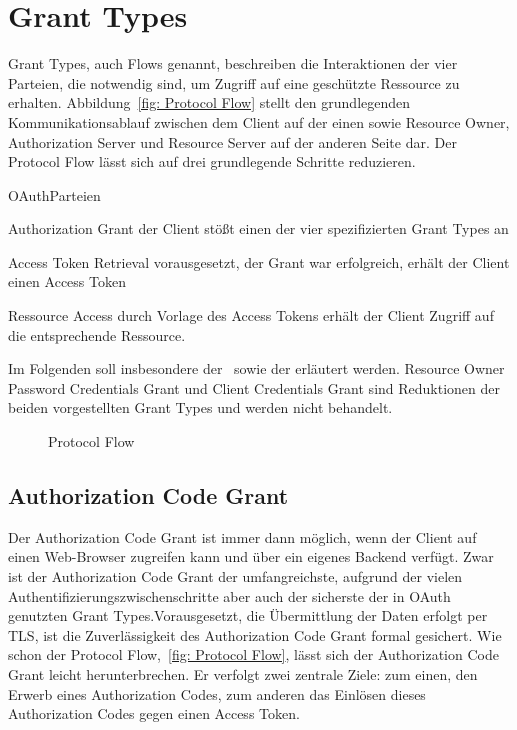 \section{\glspl{Grant Type}}\label{GrantTypes} \glspl{Grant Type}, auch Flows
genannt, beschreiben die Interaktionen der vier Parteien, die notwendig sind, um
Zugriff auf eine geschützte Ressource zu erhalten. Abbildung~\ref{fig: Protocol
Flow} stellt den grundlegenden Kommunikationsablauf zwischen dem Client auf der
einen sowie Resource Owner, Authorization Server und Resource Server auf der
anderen Seite dar. Der Protocol Flow lässt sich auf drei grundlegende Schritte
reduzieren.


\begin{labeling}{OAuthParteien}
    \item [Authorization Grant] der Client stößt einen der vier spezifizierten
    \glspl{Grant Type} an
    \item [Access Token Retrieval] vorausgesetzt, der Grant war erfolgreich,
    erhält der Client einen Access Token
    \item [Ressource Access] durch Vorlage des Access Tokens erhält der Client
    Zugriff auf die entsprechende Ressource.
\end{labeling}


Im Folgenden soll insbesondere der~ sowie der
 erläutert werden. Resource Owner Password Credentials
Grant und Client Credentials Grant sind Reduktionen der beiden vorgestellten
\glspl{Grant Type} und werden nicht behandelt.

\begin{figure}[h]
    \scalebox{.6} {
        
    }
    \caption{Protocol Flow}\label{fig: Protocol Flow}
\end{figure} 

\subsection{Authorization Code Grant}\label{ssec:authcode}
Der Authorization Code Grant ist immer dann möglich, wenn der Client auf einen
Web-Browser zugreifen kann und über ein eigenes Backend verfügt. Zwar ist der
Authorization Code Grant der umfangreichste, aufgrund der vielen
Authentifizierungszwischenschritte aber auch der sicherste der in \gls{OAuth}
genutzten \glspl{Grant Type}.Vorausgesetzt, die Übermittlung der Daten erfolgt
per \gls{TLS}, ist die Zuverlässigkeit des Authorization Code Grant formal
gesichert.\cite{Chari.2011} Wie schon der Protocol Flow,~\ref{fig: Protocol
Flow}, lässt sich der Authorization Code Grant leicht herunterbrechen. Er
verfolgt zwei zentrale Ziele: zum einen, den Erwerb eines Authorization Codes,
zum anderen das Einlösen dieses Authorization Codes gegen einen Access Token.

